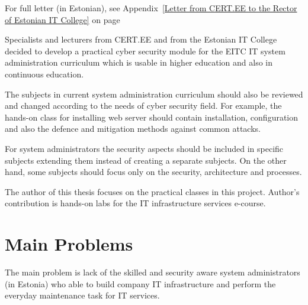 For full letter (in Estonian), see Appendix~\ref{Letter from CERT.EE to the Rector of Estonian IT College} on page ~\pageref{Letter from CERT.EE to the Rector of Estonian IT College}

Specialists and lecturers from \gls{CERT.EE} and from the Estonian IT College decided to develop a practical cyber security module for the \gls{EITC} IT system administration curriculum which is usable in higher education and also in continuous education.

The subjects in current system administration curriculum should also be reviewed and changed according to the needs of cyber security field. For example, the hands-on class for installing web server should contain installation, configuration and also the defence and mitigation methods against common attacks. 

For system administrators the security aspects should be included in specific subjects extending them instead of creating a separate subjects. On the other hand, some subjects should focus only on the security, architecture and processes.

The author of this thesis focuses on the practical classes in this project. Author's contribution is hands-on labs for the IT infrastructure services e-course.

\section{Main Problems}
The main problem is lack of the skilled and security aware system administrators (in Estonia) who able to build company IT infrastructure and perform the everyday maintenance task for IT services.

